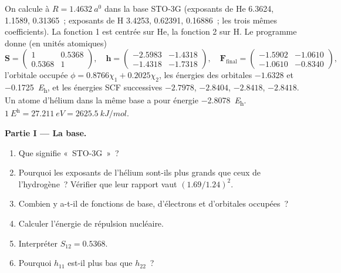 \begin{problem}
\label{pb:b3:computational-chemistry:1}
On calcule  à $R = \qty{1.4632}{\bohr}$ dans la base STO-3G
(exposants de He
6.3624, 1.1589, 0.31365~; exposants de H 3.4253, 0.62391, 0.16886~; les
trois mêmes coefficients). La fonction 1 est centrée sur He, la fonction
2 sur H. Le programme donne (en unités atomiques)
\[
\mathbf S = \begin{pmatrix}1 & 0.5368\\ 0.5368 & 1\end{pmatrix},\quad
\mathbf h = \begin{pmatrix}-2.5983 & -1.4318\\ -1.4318 & -1.7318\end{pmatrix},\quad
\mathbf F_{\mathrm{final}} = \begin{pmatrix}-1.5902 & -1.0610\\ -1.0610 & -0.8340
\end{pmatrix},
\]
l'orbitale occupée $\phi = 0.8766\chi_1 + 0.2025\chi_2$, les énergies des
orbitales
$-1.6328$ et \qty{-0.1725}{\hartree}, et les énergies SCF successives
$-2.7978$, $-2.8404$,
$-2.8418$, $-2.8418$. Un atome d'hélium dans la même base a pour énergie
\qty{-2.8078}{\hartree}. $\qty{1}{\hartree} = \qty{27.211}{eV} =
\qty{2625.5}{kJ/mol}$.

\medskip\noindent\textbf{Partie I --- La base.}
\begin{enumerate}
  \item Que signifie «~STO-3G~»~?
  \item Pourquoi les exposants de l'hélium sont-ils plus grands que ceux
        de l'hydrogène~? Vérifier que leur rapport vaut $(1.69/1.24)^2$.
  \item Combien y a-t-il de fonctions de base, d'électrons et d'orbitales
        occupées~?
  \item Calculer l'énergie de répulsion nucléaire.
  \item Interpréter $S_{12} = 0.5368$.
  \item Pourquoi $h_{11}$ est-il plus bas que $h_{22}$~?
\end{enumerate}


\end{problem}
